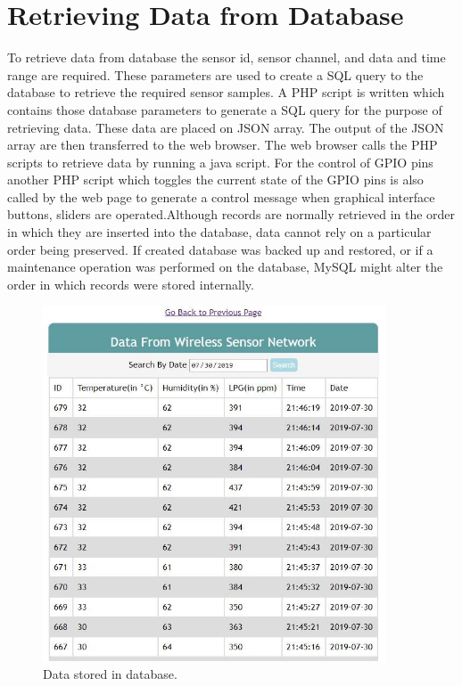 \section{Retrieving Data from Database}
To retrieve data from database the sensor id, sensor channel, and data and time range are required. These parameters are used to create a SQL query to the database to retrieve the required sensor samples. A PHP script is written which contains those database parameters to generate a SQL query for the purpose of retrieving data. These data are placed on JSON array. The output of the JSON array are then transferred to the web browser. The web browser calls the PHP scripts to retrieve data by running a java script. For the control of GPIO pins another PHP script which toggles the current state of the GPIO pins is also called by the web page to generate a control message when graphical interface buttons, sliders are operated.Although records are normally retrieved in the order in which they are inserted into the database, data cannot rely on a particular order being preserved. If created database was backed up and restored, or if a maintenance operation was performed on the database, MySQL might alter the order in which records were stored internally.
\begin{figure}[H]
  \centering
  \includegraphics[width=4in]{37}
  \caption{Data stored in database.}\label{fig37}
\end{figure}
